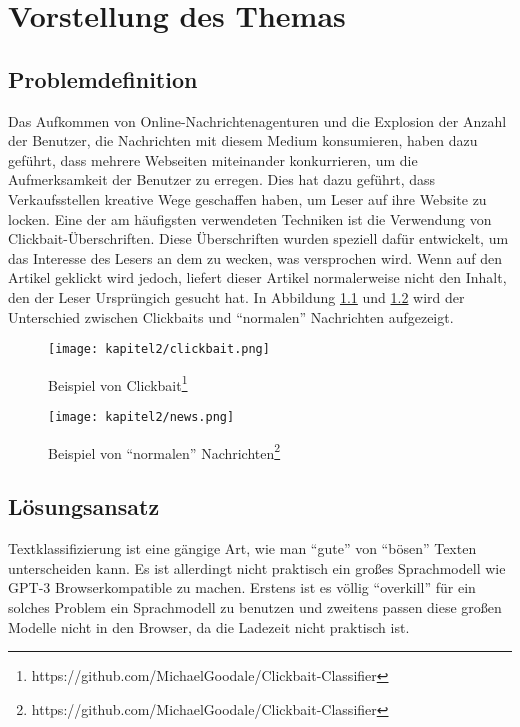 \chapter{Vorstellung des Themas}
\section{Problemdefinition}
Das Aufkommen von Online-Nachrichtenagenturen und die Explosion der Anzahl der Benutzer, die Nachrichten mit diesem Medium konsumieren, haben dazu geführt, dass mehrere Webseiten miteinander konkurrieren, um die Aufmerksamkeit der Benutzer zu erregen. Dies hat dazu geführt, dass Verkaufsstellen kreative Wege geschaffen haben, um Leser auf ihre Website zu locken. Eine der am häufigsten verwendeten Techniken ist die Verwendung von Clickbait-Überschriften. Diese Überschriften wurden speziell dafür entwickelt, um das Interesse des Lesers an dem zu wecken, was versprochen wird. Wenn auf den Artikel geklickt wird jedoch, liefert dieser Artikel normalerweise nicht den Inhalt, den der Leser Ursprüngich gesucht hat. In Abbildung \ref{Kap2:ClickBait} und \ref{Kap2:News} wird der Unterschied zwischen Clickbaits und \enquote{normalen} Nachrichten aufgezeigt.

\begin{figure}[ht]
  \centering
  \texttt{[image: kapitel2/clickbait.png]}
  \caption[Beispiel von Clickbait]{Beispiel von Clickbait\footnote{https://github.com/MichaelGoodale/Clickbait-Classifier}}
  \label{Kap2:ClickBait}
\end{figure}


\begin{figure}[ht]
  \centering
  \texttt{[image: kapitel2/news.png]}
  \caption[Beispiel von \enquote{normalen} Nachrichten]{Beispiel von \enquote{normalen} Nachrichten\footnote{https://github.com/MichaelGoodale/Clickbait-Classifier}}
  \label{Kap2:News}
\end{figure}


\section{Lösungsansatz}
Textklassifizierung ist eine gängige Art, wie man \enquote{gute} von \enquote{bösen} Texten unterscheiden kann. Es ist allerdingt nicht praktisch ein großes Sprachmodell wie GPT-3 Browserkompatible zu machen. Erstens ist es völlig \enquote{overkill} für ein solches Problem ein Sprachmodell zu benutzen und zweitens passen diese großen Modelle nicht in den Browser, da die Ladezeit nicht praktisch ist.

